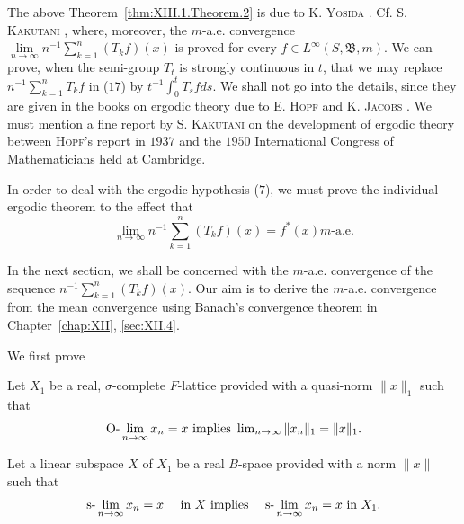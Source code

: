 \begin{remarkn}[Remark $1$] The above Theorem~\ref{thm:XIII.1.Theorem.2} is due to K. \textsc{Yosida} \cite{yosida360}. Cf. S. \textsc{Kakutani} \cite{kakutani130}, where, moreover, the $m$-a.e. convergence $\lim\limits_{n\to \infty}n^{-1}\sum\limits_{k=1}^{n}(T_kf)(x)$ is proved for every $f\in L^{\infty}(S,\mathfrak{B},m)$. We can prove, when the semi-group $T_{t}$ is strongly continuous in $t$, that we may replace \slim $n^{-1}\sum\limits_{k=1}^{n}T_{k}f$ in ($17$) by \slim $t^{-1}\int_{0}^{t}T_{s}fds$. We shall not go into the details, since they are given in the books on ergodic theory due to E. \textsc{Hopf} \cite{hirsch109} and K. \textsc{Jacobs} \cite{ito123}. We must mention a fine report by S. \textsc{Kakutani} \cite{kakutani132} on the development of ergodic theory between \textsc{Hopf}'s report in $1937$ and the $1950$ International Congress of Mathematicians held at Cambridge. 
\end{remarkn}

In order to deal with the ergodic hypothesis ($7$), we must prove the individual ergodic theorem to the effect that 
\[
\lim\limits _{n \rightarrow \infty} n ^{-1} \sum\limits_{k=1} ^{n} (T _{k} f) (x) = f ^{*} (x) m\text{-a.e.}
\]

In the next section, we shall be concerned with the $m$-a.e. convergence of the sequence $n^{-1} \sum\limits_{k=1}^{n} (T_k f)(x)$. Our aim is to derive the $m$-a.e. convergence from the mean convergence using Banach's convergence theorem in Chapter~\ref{chap:XII}, \ref{sec:XII.4}. 


\label{sec:XIII.2}

We first prove 

\begin{theorem}\label{thm:XIII.2.Theorem.1} Let $X_{1}$ be a real, $\sigma$-complete $F$-lattice provided with a quasi-norm $\| x \|_{1}$ such that 
\begin{equation}\label{eq:XIII.2.1}
\text{O-}\lim _{n \to \infty} x _{n} = x \text{ implies } \lim\nolimits _{n \to \infty} \| x _{n} \| _{1} = \| x \| _{1}.
\end{equation}
\end{theorem}

Let a linear subspace $X$ of $X_{1}$ be a real $B$-space provided with a norm $\| x \|$ such that 
\begin{equation}\label{eq:XIII.2.2}
\text{s-}\lim _{n \to \infty} x _{n} = x \quad \text{ in } X \text{ implies } \quad \text{s-}\lim _{n \to \infty} x _{n} = x \text{ in } X _{1}.
\end{equation}

